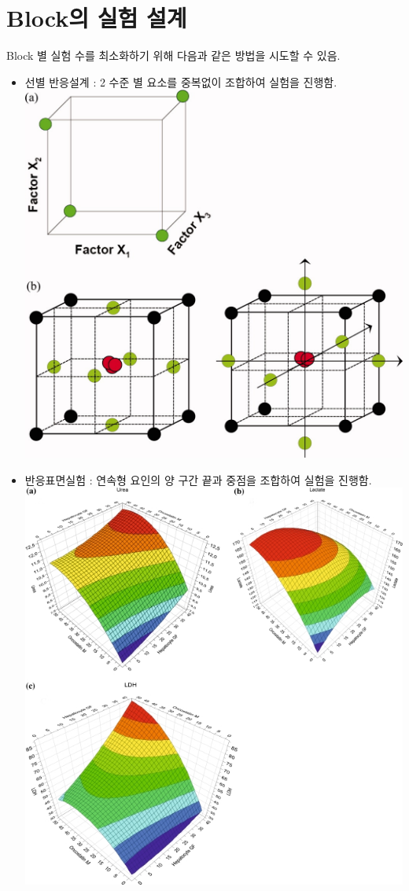 \documentclass{article}
\begin{document}
    \section{Block의 실험 설계}
    Block 별 실험 수를 최소화하기 위해 다음과 같은 방법을 시도할 수 있음.
    \begin{itemize}
        \item 선별 반응설계 : 2 수준 별 요소를 중복없이 조합하여 실험을 진행함.\\
        \includegraphics[scale=0.3]{fatorial design.jpg}
        \item 반응표면실험 : 연속형 요인의 양 구간 끝과 중점을 조합하여 실험을 진행함. \\
        \includegraphics[scale=0.3]{reactionsurfae.jpg}
    \end{itemize}
\end{document}
